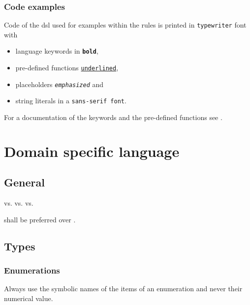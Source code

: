 \documentclass[draft]{efsguide}
\begin{document}
\subsection*{Code examples}
Code of the \gls{dsl} used for examples within the rules is printed in \texttt{typewriter} font with 
\begin{itemize}
\item language keywords in \texttt{\textbf{bold}},
\item pre-defined functions \texttt{\underline{underlined}},
\item placeholders \texttt{\emph{emphasized}} and
\item string literals in a \texttt{\textsf{sans-serif font}}.
\end{itemize}

For a documentation of the keywords and the pre-defined functions see \cite{efstechdesign}.



\chapter{Domain specific language}

\section{General}
\begin{rules}
\item {}  vs.  vs. \code{[]} vs.  
\item {} shall be preferred over . 
\item \deleted
\end{rules}

\section{Types}
\subsection{Enumerations}
\label{sec:enumeration}
\begin{rules}
\item Always use the symbolic names of the items of an enumeration and never their numerical value. 
\end{rules}
\end{document}
